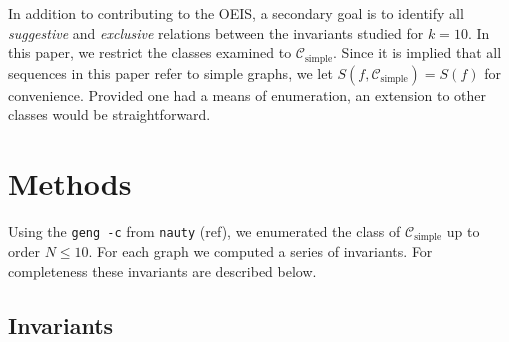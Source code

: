 \documentclass[12pt]{article}
\newcommand{\SIMPLECLASS}{\mathcal{C}_\text{simple}}
\begin{document}
In addition to contributing to the OEIS, a secondary goal is to identify all \textit{suggestive} and \textit{exclusive} relations between the invariants studied for $k=10$. In this paper, we restrict the classes examined to $\SIMPLECLASS$. Since it is implied that all sequences in this paper refer to simple graphs, we let $S(f,\SIMPLECLASS)=S(f)$ for convenience. Provided one had a means of enumeration, an extension to other classes would be straightforward.


\section{Methods}
Using the \texttt{geng -c} from \texttt{nauty} (ref), we enumerated the class of $\SIMPLECLASS$ up to order $N \le 10$.
For each graph we computed a series of invariants. For completeness these invariants are described below.

\subsection{Invariants}
\end{document}
